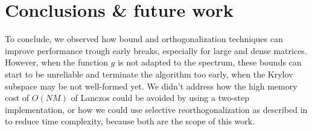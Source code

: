\documentclass[11pt]{article}
\theoremstyle{definition}
\theoremstyle{remark}
\theoremstyle{experimental}
\begin{document}
\section{Conclusions \& future work}

To conclude, we observed how bound and orthogonalization techniques can improve performance
trough early breaks, especially for large and dense matrices. However, when the function $ g $ is
not adapted to the spectrum, these bounds can start to be
unreliable and terminate the algorithm too early, when the Krylov subspace may be not well-formed yet.
We didn't address how the high memory cost of $ O(N M) $ of Lanczos could be avoided by
using a two-step implementation, or how we could use selective reorthogonalization as described in
\cite{demmel1997} to reduce time complexity, because both are the scope of this work.

\clearpage


\nocite{*}
\end{document}
